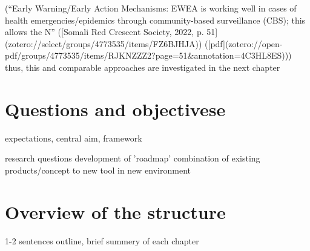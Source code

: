 (“Early Warning/Early Action Mechanisms: EWEA is working well in cases of health emergencies/epidemics through community-based surveillance (CBS); this allows the N” ([Somali Red Crescent Society, 2022, p. 51](zotero://select/groups/4773535/items/FZ6BJHJA)) ([pdf](zotero://open-pdf/groups/4773535/items/RJKNZZZ2?page=51&annotation=4C3HL8ES))) 
thus, this and comparable approaches are investigated in the next chapter

\section{Questions and objectivese}
expectations, central aim, framework



research questions
development of 'roadmap'
combination of existing products/concept to new tool in new environment




\section{Overview of the structure}
1-2 sentences outline, brief summery of each chapter

